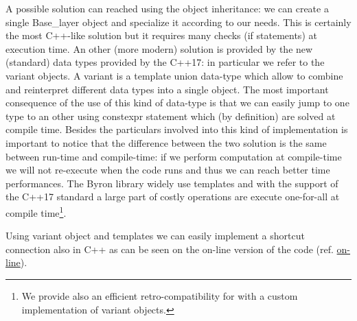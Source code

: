 \documentclass{standalone}
\begin{document}
A possible solution can reached using the object inheritance: we can create a single \textsf{Base\_layer} object and specialize it according to our needs.
This is certainly the most C++-like solution but it requires many checks (if statements) at execution time.
An other (more modern) solution is provided by the new (standard) data types provided by the C++17: in particular we refer to the \textsf{variant} objects.
A \textsf{variant} is a \textsf{template union} data-type which allow to combine and reinterpret different data types into a single object.
The most important consequence of the use of this kind of data-type is that we can easily jump to one type to an other using \textsf{constexpr} statement which (by definition) are solved at compile time.
Besides the particulars involved into this kind of implementation is important to notice that the difference between the two solution is the same between run-time and compile-time: if we perform computation at compile-time we will not re-execute when the code runs and thus we can reach better time performances.
The Byron library widely use \textsf{template}s and with the support of the C++17 standard a large part of costly operations are execute one-for-all at compile time\footnote{
  We provide also an efficient retro-compatibility for  with a custom implementation of \textsf{variant} objects.
}.

Using \textsf{variant} object and \textsf{templates} we can easily implement a shortcut connection also in C++ as can be seen on the on-line version of the code (ref. \href{https://github.com/Nico-Curti/Byron/blob/master/src/shortcut_layer.cpp}{on-line}).
\end{document}
